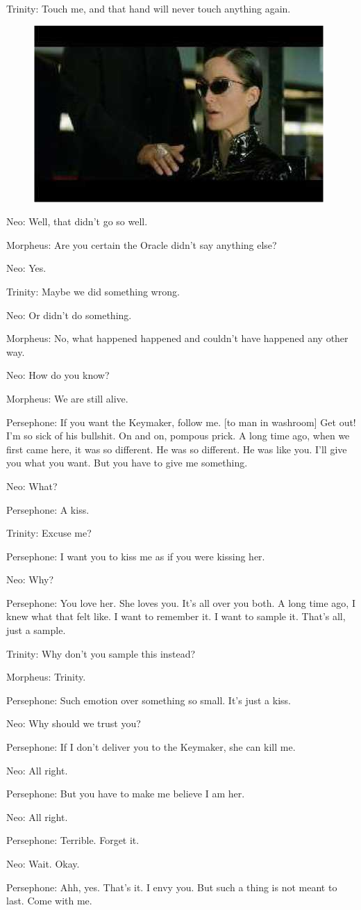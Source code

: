 \documentclass[UTF8]{ctexart}
\newenvironment{myquote}{\color{green} \setlength{\leftskip}{6em} \setlength{\rightskip}{4em} \setlength{\parindent}{-2em}}{\par}
\begin{document}
\begin{myquote}
Trinity: Touch me, and that hand will never touch anything again.

\begin{figure}[htb]
\centering
\includegraphics[width=0.5\linewidth]{fig/read_reloaded-100}
\end{figure}

Neo: Well, that didn't go so well.

Morpheus: Are you certain the Oracle didn't say anything else?

Neo: Yes.

Trinity: Maybe we did something wrong.

Neo: Or didn't do something.

Morpheus: No, what happened happened and couldn't have happened any other way.

Neo: How do you know?

Morpheus: We are still alive.

Persephone: If you want the Keymaker, follow me. [to man in washroom] Get out! I'm so sick of his bullshit. On and on, pompous prick. A long time ago, when we first came here, it was so different. He was so different. He was like you. I'll give you what you want. But you have to give me something.

Neo: What?

Persephone: A kiss.

Trinity: Excuse me?

Persephone: I want you to kiss me as if you were kissing her.

Neo: Why?

Persephone: You love her. She loves you. It's all over you both. A long time ago, I knew what that felt like. I want to remember it. I want to sample it. That's all, just a sample.

Trinity: Why don't you sample this instead?

Morpheus: Trinity.

Persephone: Such emotion over something so small. It's just a kiss.

Neo: Why should we trust you?

Persephone: If I don't deliver you to the Keymaker, she can kill me.

Neo: All right.

Persephone: But you have to make me believe I am her.

Neo: All right.

Persephone: Terrible. Forget it.

Neo: Wait. Okay.

Persephone: Ahh, yes. That's it. I envy you. But such a thing is not meant to last. Come with me.
\end{myquote}
\end{document}
